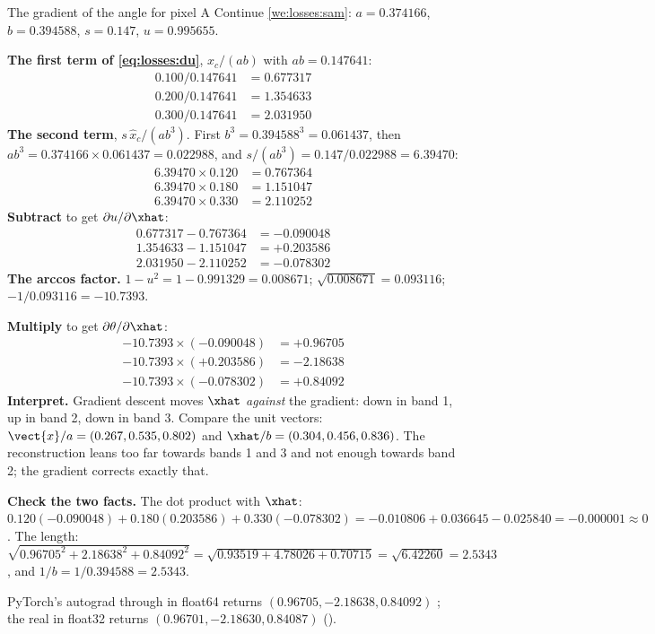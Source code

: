 \begin{worked}[label={we:losses:samgrad}]{The gradient of the angle for pixel A}
Continue \cref{we:losses:sam}: $a = 0.374166$, $b = 0.394588$, $s = 0.147$, $u = 0.995655$.

\textbf{The first term of \cref{eq:losses:du}}, $x_c/(ab)$ with $ab = 0.147641$:
\begin{align*}
0.100/0.147641 &= 0.677317\\
0.200/0.147641 &= 1.354633\\
0.300/0.147641 &= 2.031950
\end{align*}
\textbf{The second term}, $s\,\hat{x}_c/(ab^3)$. First $b^3 = 0.394588^3 = 0.061437$, then
$ab^3 = 0.374166 \times 0.061437 = 0.022988$, and $s/(ab^3) = 0.147/0.022988 = 6.39470$:
\begin{align*}
6.39470 \times 0.120 &= 0.767364\\
6.39470 \times 0.180 &= 1.151047\\
6.39470 \times 0.330 &= 2.110252
\end{align*}
\textbf{Subtract} to get $\partial u/\partial\xhat$:
\begin{align*}
0.677317 - 0.767364 &= -0.090048\\
1.354633 - 1.151047 &= +0.203586\\
2.031950 - 2.110252 &= -0.078302
\end{align*}
\textbf{The arccos factor.} $1 - u^2 = 1 - 0.991329 = 0.008671$; $\sqrt{0.008671} = 0.093116$;
$-1/0.093116 = -10.7393$.

\textbf{Multiply} to get $\partial\theta/\partial\xhat$:
\begin{align*}
-10.7393 \times (-0.090048) &= +0.96705\\
-10.7393 \times (+0.203586) &= -2.18638\\
-10.7393 \times (-0.078302) &= +0.84092
\end{align*}
\textbf{Interpret.} Gradient descent moves $\xhat$ \emph{against} the gradient: down in
band 1, up in band 2, down in band 3. Compare the unit vectors: $\vect{x}/a = (0.267, 0.535,
0.802)$ and $\xhat/b = (0.304, 0.456, 0.836)$. The reconstruction leans too far towards bands
1 and 3 and not enough towards band 2; the gradient corrects exactly that.

\textbf{Check the two facts.} The dot product with $\xhat$:
$0.120(-0.090048) + 0.180(0.203586) + 0.330(-0.078302) = -0.010806 + 0.036645 - 0.025840 =
-0.000001 \approx 0$. The length: $\sqrt{0.96705^2 + 2.18638^2 + 0.84092^2} = \sqrt{0.93519 +
4.78026 + 0.70715} = \sqrt{6.42260} = 2.5343$, and $1/b = 1/0.394588 = 2.5343$.

PyTorch's autograd through  in float64 returns $(0.96705, -2.18638,
0.84092)$ \tagC; the real  in float32 returns $(0.96701, -2.18630,
0.84087)$ \tagC{} ().
\end{worked}

